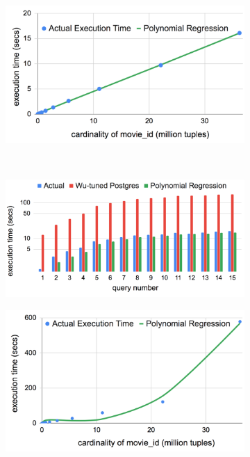 \documentclass{article}
\begin{document}
\begin{figure}
	\label{fig:c1}
\begin{subfigure}{.5\linewidth}
	\hspace{-2em}
	\includegraphics[scale=0.39]{./figs/exp/7/a.png}
	\label{fig:corr1_train}
\end{subfigure}
~
\begin{subfigure}{.5\linewidth}
	\includegraphics[scale=0.37]{./figs/exp/8/a.png}
	\label{fig:corr1_test}
\end{subfigure}
\medskip
\begin{subfigure}{.5\linewidth}
	\hspace{-2em}
	\includegraphics[scale=0.39]{./figs/exp/7/b.png}

\end{subfigure}
\end{figure}
\end{document}
